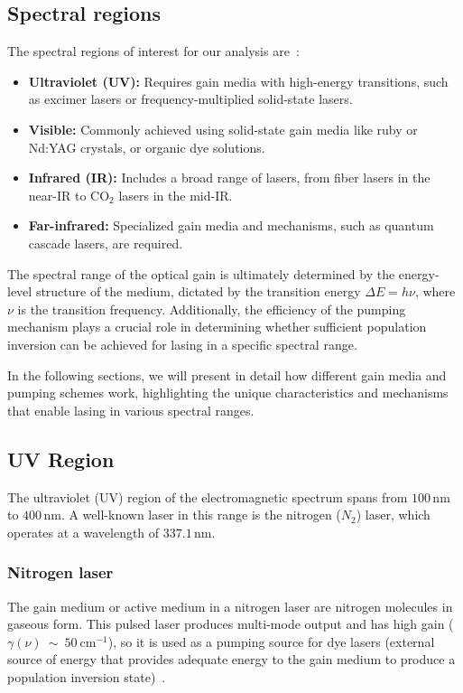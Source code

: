 \documentclass[prl,twocolumn]{revtex4-1}
\begin{document}
\subsection{Spectral regions}
The spectral regions of interest for our analysis are~\cite{Saleh2007}:
%
\begin{itemize}
    \item \textbf{Ultraviolet (UV):} Requires gain media with high-energy transitions, such as excimer lasers or frequency-multiplied solid-state lasers.
    \item \textbf{Visible:} Commonly achieved using solid-state gain media like ruby or Nd:YAG crystals, or organic dye solutions.
    \item \textbf{Infrared (IR):} Includes a broad range of lasers, from fiber lasers in the near-IR to $\text{CO}_2$ lasers in the mid-IR.
    \item \textbf{Far-infrared:} Specialized gain media and mechanisms, such as quantum cascade lasers, are required.
\end{itemize}

The spectral range of the optical gain is ultimately determined by the energy-level structure of the medium, dictated by the transition energy $\Delta E = h \nu$, where $\nu$ is the transition frequency. Additionally, the efficiency of the pumping mechanism plays a crucial role in determining whether sufficient population inversion can be achieved for lasing in a specific spectral range.

In the following sections, we will present in detail how different gain media and pumping schemes work, highlighting the unique characteristics and mechanisms that enable lasing in various spectral ranges.

\subsection{UV Region}
The ultraviolet (UV) region of the electromagnetic spectrum spans from $100 \, \text{nm}$ to $400 \, \text{nm}$. A well-known laser in this range is the nitrogen ($N_2$) laser, which operates at a wavelength of $337.1 \, \text{nm}$. 

\subsubsection{\textbf{Nitrogen laser}}
The gain medium or active medium in a nitrogen laser are nitrogen molecules in gaseous form. This pulsed laser produces multi-mode output and has high gain ($\gamma(\nu)~\sim~50~\text{cm}^{-1}$), so it is used as a pumping source for dye lasers (external source of energy that provides adequate energy to the gain medium to produce a population inversion state)~\cite{nitrogen_lasers}.
\end{document}
